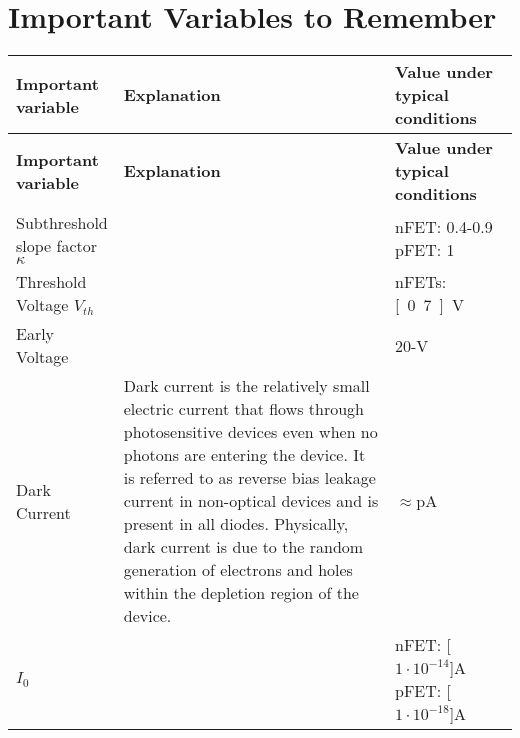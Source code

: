 \documentclass[main]{subfiles}
\begin{document}
\section{Important Variables to Remember}


\renewcommand{\arraystretch}{1.5}

\begin{longtable}{p{0.2\linewidth} p{0.55\linewidth} p{0.25\linewidth}}
\hline \textbf{Important variable} & \textbf{Explanation} & \textbf{Value under typical conditions}\\ \hline\hline
\endfirsthead

\hline \textbf{Important variable} & \textbf{Explanation} & \textbf{Value under typical conditions}\\ \hline\hline
\endhead

Subthreshold slope factor $\kappa$ & & nFET: 0.4-0.9 \newline pFET: 1\\
Threshold Voltage $V_{th}$ & & nFETs: \unit[0.7]{V}\\
Early Voltage & & 20-\unit[30]{V}\\
Dark Current & Dark current is the relatively small electric current that flows through photosensitive devices even when no photons are entering the device. It is referred to as reverse bias leakage current in non-optical devices and is present in all diodes. Physically, dark current is due to the random generation of electrons and holes within the depletion region of the device.& $\approx$\unit[1-10]{pA}\\
$I_0$ & & nFET: \unit[$1\cdot10^{-14}$]{A} \newline pFET: \unit[$1\cdot10^{-18}$]{A}\\
\end{longtable}

\end{document}
